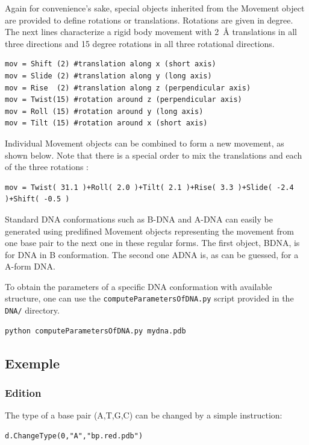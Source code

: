 \documentclass[12pt,a4paper]{article}
\begin{document}
Again for convenience's sake, special objects inherited from the Movement object are provided to define rotations or translations. Rotations are given in degree. The next lines characterize a rigid body movement with 2~{\AA} translations in all three directions and 15 degree rotations in all three rotational directions. 
\begin{verbatim}
mov = Shift (2) #translation along x (short axis)
mov = Slide (2) #translation along y (long axis)
mov = Rise  (2) #translation along z (perpendicular axis)
mov = Twist(15) #rotation around z (perpendicular axis)
mov = Roll (15) #rotation around y (long axis) 
mov = Tilt (15) #rotation around x (short axis)
\end{verbatim} 
 
Individual Movement objects can be combined to form a new movement, as shown below. Note that there is a special order to mix the translations and each of the three rotations : 

\begin{verbatim}
mov = Twist( 31.1 )+Roll( 2.0 )+Tilt( 2.1 )+Rise( 3.3 )+Slide( -2.4 )+Shift( -0.5 )
\end{verbatim} 


Standard DNA conformations such as B-DNA and A-DNA can easily be generated using predifined Movement objects representing the movement from one base pair to the next one in these regular forms. The first object, BDNA, is for DNA in B conformation. The second one ADNA is, as can be guessed, for a A-form DNA.
 
To obtain the parameters of a specific DNA conformation with available structure, one can use the {\tt computeParametersOfDNA.py} script provided in the {\tt DNA/} directory.
\begin{verbatim}
python computeParametersOfDNA.py mydna.pdb
\end{verbatim} 

\subsection{Exemple}
\subsubsection{Edition}

The type of a base pair (A,T,G,C) can be changed by a simple instruction:
\begin{verbatim}
d.ChangeType(0,"A","bp.red.pdb")
\end{verbatim}
\end{document}
